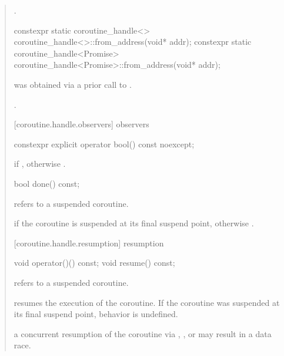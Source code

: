 \begin{quote}
\begin{itemdescr}
	\pnum
	\returns {}.
\end{itemdescr}


\begin{itemdecl}
  constexpr static coroutine_handle<> coroutine_handle<>::from_address(void* addr);		
  constexpr static coroutine_handle<Promise> coroutine_handle<Promise>::from_address(void* addr);		
\end{itemdecl}

\begin{itemdescr}
	\pnum
	\precondition {} was obtained via a prior call to .
	
	\pnum
	\postconditions {}.
\end{itemdescr}

[coroutine.handle.observers]{ observers}
\begin{itemdecl}
  constexpr explicit operator bool() const noexcept;
\end{itemdecl}

\begin{itemdescr}
  \pnum
  \returns {} if , otherwise .
\end{itemdescr}

\begin{itemdecl}
  bool done() const; 
\end{itemdecl}
\begin{itemdescr}
  \pnum
  \precondition {} refers to a suspended coroutine.
	
  \pnum
  \returns {} if the coroutine is suspended
    at its final suspend point, otherwise .
\end{itemdescr}

[coroutine.handle.resumption]{ resumption}
\begin{itemdecl}
  void operator()() const;
  void resume() const;	
\end{itemdecl}
\begin{itemdescr}
  \pnum
  \precondition {} refers to a suspended coroutine.
  
  \pnum
  \effects resumes the execution of the coroutine. If the coroutine was suspended
  at its final suspend point, behavior is undefined.
  
  \pnum
  \sync a concurrent resumption of the coroutine via , , or  may result in a data race.
  

\end{itemdescr}
\end{quote}
